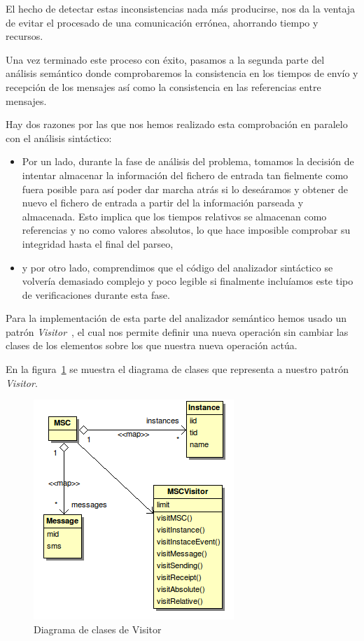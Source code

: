 El hecho de detectar estas inconsistencias nada más producirse, nos da
la ventaja de evitar el procesado de una comunicación errónea,
ahorrando tiempo y recursos.

Una vez terminado este proceso con éxito, pasamos a la segunda parte
del análisis semántico donde comprobaremos la consistencia en los
tiempos de envío y recepción de los mensajes así como la consistencia
en las referencias entre mensajes.

Hay dos razones por las que nos hemos realizado esta comprobación en
paralelo con el análisis sintáctico:
\begin{itemize}
\item Por un lado, durante la fase de análisis del problema, tomamos
  la decisión de intentar almacenar la información del fichero de
  entrada tan fielmente como fuera posible para así poder dar marcha
  atrás si lo deseáramos y obtener de nuevo el fichero de entrada a
  partir del la información parseada y almacenada. Esto implica que
  los tiempos relativos se almacenan como referencias y no como
  valores absolutos, lo que hace imposible comprobar su integridad
  hasta el final del parseo,
\item y por otro lado, comprendimos que el código del analizador
  sintáctico se volvería demasiado complejo y poco legible si
  finalmente incluíamos este tipo de verificaciones durante esta fase.
\end{itemize}

Para la implementación de esta parte del analizador semántico hemos
usado un patrón \textit{Visitor}~\cite{gof}, el cual nos permite
definir una nueva operación sin cambiar las clases de los elementos
sobre los que nuestra nueva operación actúa.

En la figura~\ref{fig:diagvisitor} se muestra el diagrama de clases que
representa a nuestro patrón \textit{Visitor}.

\begin{figure}
  \centering 
  \includegraphics[scale=0.7]{./images/diag_visitor.png}
  \caption{Diagrama de clases de Visitor}
  \label{fig:diagvisitor}
\end{figure}

